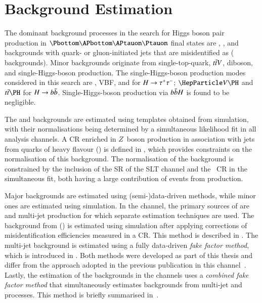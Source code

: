\section{Background Estimation}%
\label{sec:background_estimation}

The dominant background processes in the search for Higgs boson pair production
in $\bbtautau$ final states are \Zjets, \ttbar, and backgrounds with quark- or
gluon-initiated jets that are misidentified as \tauhadvis (\faketauhadvisC
backgrounds).
Minor backgrounds originate from single-top-quark, $t\bar{t} V$, diboson, and
single-Higgs-boson production.  The single-Higgs-boson production modes
considered in this search are \ggF, VBF, \VH and \ttH for $H \to \tau^{+} \tau^{-}$; $\VH$
and $\ttH$ for $H \to b\bar{b}$. Single-Higgs-boson production via $b\bar{b} H$ is
found to be negligible.

The \Zjets and \ttbar backgrounds are estimated using templates obtained from
simulation, with their normalisations being determined by a simultaneous
likelihood fit in all analysis channels. A CR enriched in $Z$~boson production
in association with jets from quarks of heavy flavour (\ZHF) is defined in
, which provides constraints on the normalisation of this
background. The normalisation of the \ttbar background is constrained by the
inclusion of the SR of the \lephad SLT channel and the \ZHF~CR in the
simultaneous fit, both having a large contribution of events from \ttbar
production.

Major \faketauhadvisC backgrounds are estimated using (semi-)data-driven methods,
while minor ones are estimated using simulation. In the \hadhad channel, the
primary sources of \faketauhadvis are \ttbar and multi-jet production for which
separate estimation techniques are used. The \faketauhadvisC background from
\ttbar (\ttbarFakes) is estimated using simulation after applying corrections of
\jettotauhadvis misidentification efficiencies measured in a CR. This method is
described in . The multi-jet background is
estimated using a fully data-driven \emph{fake factor method}, which is
introduced in . Both methods were developed as part of
this thesis and differ from the approach adopted in the previous publication in
this channel~\cite{HIGG-2016-16-witherratum}. Lastly, the estimation of the
\faketauhadvisC backgrounds in the \lephad channels uses a \emph{combined fake
  factor method} that simultaneously estimates \faketauhadvisC backgrounds from
multi-jet and \ttbar processes. This method is briefly summarised
in~.

